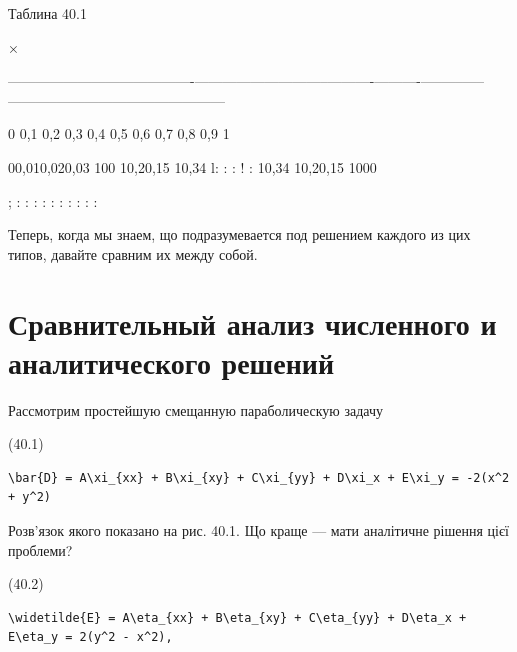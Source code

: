 \documentclass[
  ukrainian,
]{article}
\begin{document}
Таблина 40.1

\textbar{} × \textbar{} \textbar{} \textbar{} \textbar{} \textbar{}
\textbar{} \textbar{} \textbar{} \textbar{} \textbar{} \textbar{}

\textbar---------------------------\textbar-------------\textbar------------------\textbar-----------\textbar----------\textbar----------\textbar-----\textbar-----\textbar-----\textbar-----------\textbar------------------\textbar------------------\textbar{}

\textbar{} 0 \textbar{} 0,1 \textbar{} 0,2 \textbar{} 0,3 \textbar{} 0,4
\textbar{} 0,5 \textbar{} 0,6 \textbar{} 0,7 \textbar{} 0,8 \textbar{}
0,9 \textbar{} 1 \textbar{}

00,010,020,03 \textbar{} 100 \textbar{} 10,20,15 \textbar{} 10,34
\textbar{} l: \textbar{} : \textbar{} : \textbar{} ! \textbar{} :
\textbar{} 10,34 \textbar{} 10,20,15 \textbar{} 1000 \textbar{}

; \textbar{} \textbar{} : \textbar{} : \textbar{} : \textbar{} :
\textbar{} : \textbar{} : \textbar{} : \textbar{} : \textbar{} :
\textbar{} : \textbar{}

Теперь, когда мы знаем, що подразумевается под решением каждого из цих
типов, давайте сравним их между собой.

\section{\texorpdfstring{\textbf{Сравнительный анализ численного} и
аналитического
решений}{Сравнительный анализ численного и аналитического решений}}\label{ux441ux440ux430ux432ux43dux438ux442ux435ux43bux44cux43dux44bux439-ux430ux43dux430ux43bux438ux437-ux447ux438ux441ux43bux435ux43dux43dux43eux433ux43e-ux438-ux430ux43dux430ux43bux438ux442ux438ux447ux435ux441ux43aux43eux433ux43e-ux440ux435ux448ux435ux43dux438ux439}

Рассмотрим простейшую смещанную параболическую задачу

(40.1)

\begin{verbatim}
\bar{D} = A\xi_{xx} + B\xi_{xy} + C\xi_{yy} + D\xi_x + E\xi_y = -2(x^2 + y^2)
\end{verbatim}

Розв'язок якого показано на рис. 40.1. Що краще --- мати аналітичне
рішення цієї проблеми?

(40.2)

\begin{verbatim}
\widetilde{E} = A\eta_{xx} + B\eta_{xy} + C\eta_{yy} + D\eta_x + E\eta_y = 2(y^2 - x^2),
\end{verbatim}
\end{document}
